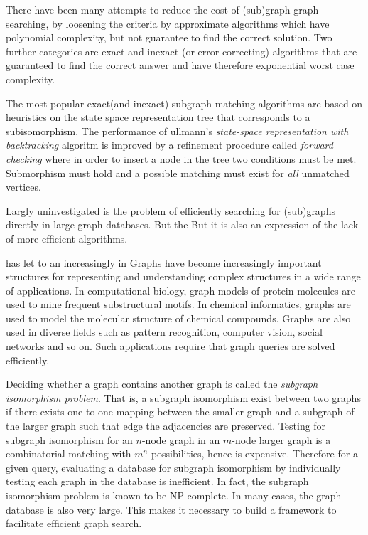 There have been many attempts to reduce the cost of (sub)graph graph searching, by loosening the criteria by approximate algorithms\cite{sasha2002} which have polynomial complexity, but not guarantee to find the correct solution. Two further categories are exact and inexact (or error correcting) algorithms that are guaranteed to find the correct answer and have therefore exponential worst case complexity.

The most popular exact(and inexact) subgraph matching algorithms are based on heuristics on the state space representation tree that corresponds to a subisomorphism\cite{ullmann}. The performance of ullmann's  \textit{state-space representation  with backtracking} algoritm is improved by a refinement procedure called \textit{forward checking} where in order to insert a node  in the tree two conditions must be met. Submorphism must hold and a possible matching must exist for \textit{all} unmatched vertices. 


Largly uninvestigated is the problem of efficiently searching for (sub)graphs directly in large graph databases. But the But it is also an expression of the lack of more efficient algorithms. 




 has let to an increasingly in Graphs have become increasingly important structures for representing and understanding complex structures in a wide range of applications.
In computational biology, graph models of protein molecules are used to mine frequent substructural motifs\cite{Huan2005}. In chemical informatics, graphs are used to model the molecular structure of chemical compounds. Graphs are also used in diverse fields such as pattern recognition, computer vision, social networks and so on. Such applications require that graph queries are solved efficiently.

Deciding whether a graph contains another graph is called the \textit{subgraph isomorphism problem}. That is, a subgraph isomorphism exist between two graphs if there exists one-to-one mapping between the smaller graph and a subgraph of the larger graph such that edge the adjacencies are preserved. Testing for subgraph isomorphism for an $n$-node graph in an $m$-node larger graph is a combinatorial matching with $m^n$ possibilities, hence is expensive. Therefore for a given query, evaluating a database for subgraph  isomorphism by individually testing each graph  in the database is inefficient.  In fact, the subgraph isomorphism problem is known to be NP-complete\cite{np-complete}. In  many 
cases, the graph database is also very large. This makes it necessary to build a framework to facilitate efficient graph search.

